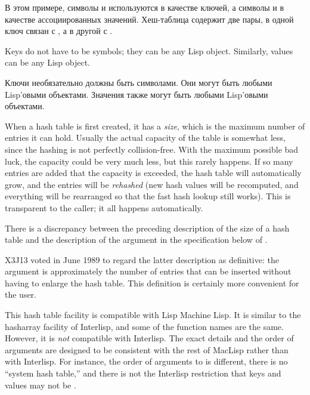 В этом примере, символы  и  используются в качестве ключей, а
символы  и  в качестве ассоциированных значений. Хеш-таблица
содержит две пары, в одной ключ  связан с , а в другой
 с .

Keys do not have to be symbols; they can be any Lisp object.  Similarly,
values can be any Lisp object.

Ключи необязательно должны быть символами. Они могут быть любыми Lisp'овыми
объектами. Значения также могут быть любыми Lisp'овыми объектами.

\begin{obsolete}
When a hash table is first created, it has a \emph{size}, which is the
maximum number of entries it can hold.  Usually the actual capacity of
the table is somewhat less, since the hashing is not perfectly
collision-free.  With the maximum possible bad luck, the capacity could
be very much less, but this rarely happens.  If so many entries are
added that the capacity is exceeded, the hash table will automatically
grow, and the entries will be \emph{rehashed} (new hash values will be
recomputed, and everything will be rearranged so that the fast hash
lookup still works).  This is transparent to the caller; it all happens
automatically.
\end{obsolete}

\begin{newer}
There is a discrepancy between the preceding description of the
size of a hash table and the description of the  argument
in the specification below
of .

X3J13 voted in June 1989  to regard the
latter description as definitive: the  argument
is approximately the number of entries that can be inserted
without having to enlarge the hash table.  This definition is certainly
more convenient for the user.
\end{newer}

\beforenoterule
\begin{incompatibility}
This hash table facility is compatible with Lisp Machine Lisp.  It
is similar to the hasharray facility of Interlisp, and some of the
function names are the same.  However, it is \emph{not} compatible with
Interlisp.  The exact details and the order of arguments are designed to
be consistent with the rest of MacLisp rather than with
Interlisp.  For instance, the order of arguments to  is
different, there is no ``system hash table,'' and there is not
the Interlisp restriction that keys and values may not be {\false}.
\end{incompatibility}
\afternoterule

